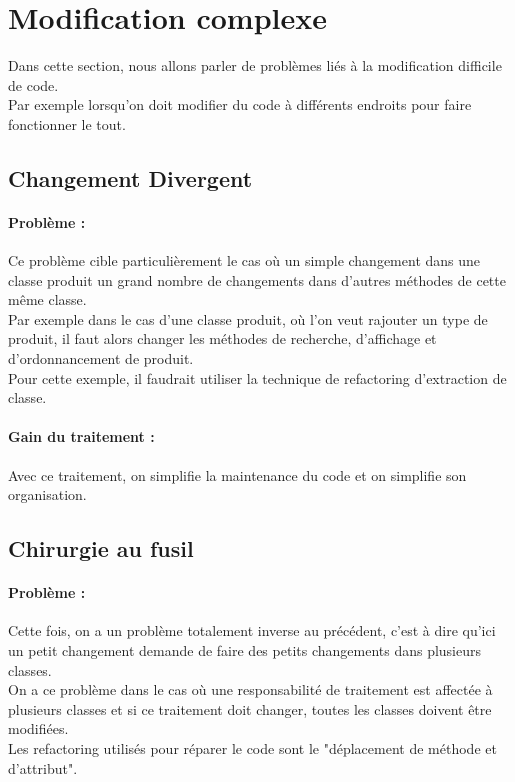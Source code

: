 \documentclass[a4paper,twoside,12pt,openright]{report}
\begin{document}
\section{Modification complexe}
Dans cette section, nous allons parler de problèmes liés à la modification difficile de code.\\
Par exemple lorsqu'on doit modifier du code à différents endroits pour faire fonctionner le tout.\\

\subsection{Changement Divergent}
\paragraph{Problème :}
Ce problème cible particulièrement le cas où un simple changement dans une classe produit un grand nombre de changements dans d'autres méthodes de cette même classe.\\
Par exemple dans le cas d'une classe produit, où l'on veut rajouter un type de produit, il faut alors changer les méthodes de recherche, d'affichage et d'ordonnancement de produit.\\
Pour cette exemple, il faudrait utiliser la technique de refactoring d'extraction de classe.\\

\paragraph{Gain du traitement :}
Avec ce traitement, on simplifie la maintenance du code et on simplifie son organisation.\\

\subsection{Chirurgie au fusil}
\paragraph{Problème :}
Cette fois, on a un problème totalement inverse au précédent, c'est à dire qu'ici un petit changement demande de faire des petits changements dans plusieurs classes.\\
On a ce problème dans le cas où une responsabilité de traitement est affectée à plusieurs classes et si ce traitement doit changer, toutes les classes doivent être modifiées.\\
Les refactoring utilisés pour réparer le code sont le "déplacement de méthode et d'attribut".\\
\end{document}
